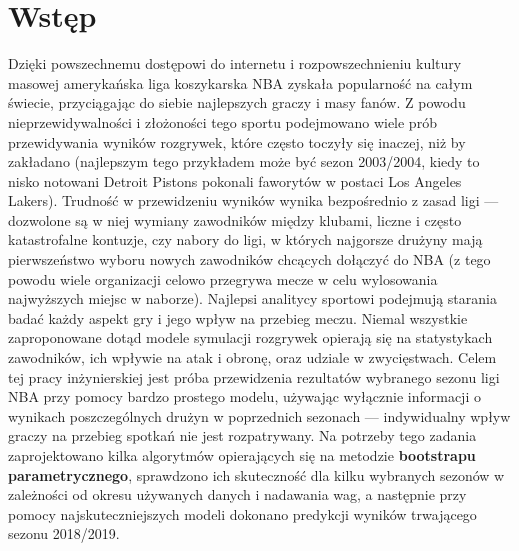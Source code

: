 \documentclass[inzynierska]{pwr_wmat_praca_dyplomowa}
\theoremstyle{plain}
\numberwithin{theorem}{chapter}
\theoremstyle{definition}
\numberwithin{theorem}{chapter}
\begin{document}
\frontmatter
\maketitle
\mainmatter
\tableofcontents

{\backmatter \chapter{Wstęp}}
Dzięki powszechnemu dostępowi do internetu i rozpowszechnieniu kultury masowej amerykańska liga koszykarska NBA zyskała popularność na całym świecie, przyciągając do siebie najlepszych graczy i masy fanów. Z powodu nieprzewidywalności i złożoności tego sportu podejmowano wiele prób przewidywania wyników rozgrywek, które często toczyły się inaczej, niż by zakładano (najlepszym tego przykładem może być sezon 2003/2004, kiedy to nisko notowani Detroit Pistons pokonali faworytów w postaci Los Angeles Lakers). Trudność w przewidzeniu wyników wynika bezpośrednio z zasad ligi --- dozwolone są w niej wymiany zawodników między klubami, liczne i często katastrofalne kontuzje, czy nabory do ligi, w których najgorsze drużyny mają pierwszeństwo wyboru nowych zawodników chcących dołączyć do NBA (z tego powodu wiele organizacji celowo przegrywa mecze w celu wylosowania najwyższych miejsc w naborze). Najlepsi analitycy sportowi podejmują starania badać każdy aspekt gry i jego wpływ na przebieg meczu. Niemal wszystkie zaproponowane dotąd modele symulacji rozgrywek opierają się na statystykach zawodników, ich wpływie na atak i obronę, oraz udziale w zwycięstwach. Celem tej pracy inżynierskiej jest próba przewidzenia rezultatów wybranego sezonu ligi NBA przy pomocy bardzo prostego modelu, używając wyłącznie informacji o wynikach poszczególnych drużyn w poprzednich sezonach --- indywidualny wpływ graczy na przebieg spotkań nie jest rozpatrywany. Na potrzeby tego zadania zaprojektowano kilka algorytmów opierających się na metodzie \textbf{bootstrapu parametrycznego}, sprawdzono ich skuteczność dla kilku wybranych sezonów w zależności od okresu używanych danych i nadawania wag, a następnie przy pomocy najskuteczniejszych modeli dokonano predykcji wyników trwającego sezonu 2018/2019. 
\end{document}
